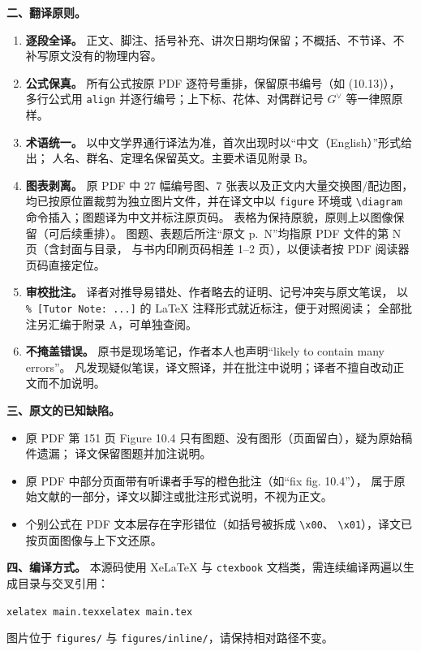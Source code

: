\noindent\textbf{二、翻译原则。}
\begin{enumerate}
  \item \textbf{逐段全译。} 正文、脚注、括号补充、讲次日期均保留；不概括、不节译、不补写原文没有的物理内容。
  \item \textbf{公式保真。} 所有公式按原 PDF 逐符号重排，保留原书编号（如 (10.13)），
        多行公式用 \texttt{align} 并逐行编号；上下标、花体、对偶群记号 $G^{\vee}$ 等一律照原样。
  \item \textbf{术语统一。} 以中文学界通行译法为准，首次出现时以“中文（English）”形式给出；
        人名、群名、定理名保留英文。主要术语见附录 B。
  \item \textbf{图表剥离。} 原 PDF 中 27 幅编号图、7 张表以及正文内大量交换图/配边图，
        均已按原位置裁剪为独立图片文件，并在译文中以 \texttt{figure} 环境或
        \texttt{\textbackslash diagram} 命令插入；图题译为中文并标注原页码。
        表格为保持原貌，原则上以图像保留（可后续重排）。
        图题、表题后所注“原文 p.~N”均指原 PDF 文件的第 N 页（含封面与目录，
        与书内印刷页码相差 1--2 页），以便读者按 PDF 阅读器页码直接定位。
  \item \textbf{审校批注。} 译者对推导易错处、作者略去的证明、记号冲突与原文笔误，
        以 \texttt{\% [Tutor Note: ...]} 的 LaTeX 注释形式就近标注，便于对照阅读；
        全部批注另汇编于附录 A，可单独查阅。
  \item \textbf{不掩盖错误。} 原书是现场笔记，作者本人也声明“likely to contain many errors”。
        凡发现疑似笔误，译文照译，并在批注中说明；译者不擅自改动正文而不加说明。
\end{enumerate}

\noindent\textbf{三、原文的已知缺陷。}
\begin{itemize}
  \item 原 PDF 第 151 页 Figure 10.4 只有图题、没有图形（页面留白），疑为原始稿件遗漏；
        译文保留图题并加注说明。
  \item 原 PDF 中部分页面带有听课者手写的橙色批注（如“fix fig. 10.4”），
        属于原始文献的一部分，译文以脚注或批注形式说明，不视为正文。
  \item 个别公式在 PDF 文本层存在字形错位（如括号被拆成 \texttt{\textbackslash x00}、
        \texttt{\textbackslash x01}），译文已按页面图像与上下文还原。
\end{itemize}

\noindent\textbf{四、编译方式。}
本源码使用 XeLaTeX 与 \texttt{ctexbook} 文档类，需连续编译两遍以生成目录与交叉引用：
\begin{center}
\texttt{xelatex main.tex}\quad\texttt{xelatex main.tex}
\end{center}
图片位于 \texttt{figures/} 与 \texttt{figures/inline/}，请保持相对路径不变。

